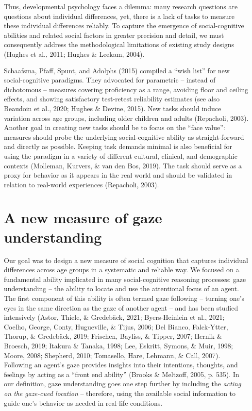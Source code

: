 \documentclass[
  man,floatsintext]{apa6}
\begin{document}
Thus, developmental psychology faces a dilemma: many research questions are questions about individual differences, yet, there is a lack of tasks to measure these individual differences reliably.
To capture the emergence of social-cognitive abilities and related social factors in greater precision and detail, we must consequently address the methodological limitations of existing study designs (Hughes et al., 2011; Hughes \& Leekam, 2004).

Schaafsma, Pfaff, Spunt, and Adolphs (2015) compiled a ``wish list'' for new social-cognitive paradigms.
They advocated for parametric -- instead of dichotomous -- measures covering proficiency as a range, avoiding floor and ceiling effects, and showing satisfactory test-retest reliability estimates (see also Beaudoin et al., 2020; Hughes \& Devine, 2015).
New tasks should induce variation across age groups, including older children and adults (Repacholi, 2003).
Another goal in creating new tasks should be to focus on the ``face value'': measures should probe the underlying social-cognitive ability as straight-forward and directly as possible.
Keeping task demands minimal is also beneficial for using the paradigm in a variety of different cultural, clinical, and demographic contexts (Molleman, Kurvers, \& van den Bos, 2019).
The task should serve as a proxy for behavior as it appears in the real world and should be validated in relation to real-world experiences (Repacholi, 2003).

\hypertarget{a-new-measure-of-gaze-understanding}{%
\section{A new measure of gaze understanding}\label{a-new-measure-of-gaze-understanding}}

Our goal was to design a new measure of social cognition that captures individual differences across age groups in a systematic and reliable way.
We focused on a fundamental ability implicated in many social-cognitive reasoning processes: gaze understanding -- the ability to locate and use the attentional focus of an agent.
The first component of this ability is often termed gaze following -- turning one's eyes in the same direction as the gaze of another agent -- and has been studied intensively (Astor, Thiele, \& Gredebäck, 2021; Byers-Heinlein et al., 2021; Coelho, George, Conty, Hugueville, \& Tijus, 2006; Del Bianco, Falck-Ytter, Thorup, \& Gredebäck, 2019; Frischen, Bayliss, \& Tipper, 2007; Hernik \& Broesch, 2019; Itakura \& Tanaka, 1998; Lee, Eskritt, Symons, \& Muir, 1998; Moore, 2008; Shepherd, 2010; Tomasello, Hare, Lehmann, \& Call, 2007).
Following an agent's gaze provides insights into their intentions, thoughts, and feelings by acting as a ``front end ability'' (Brooks \& Meltzoff, 2005, p. 535).
In our definition, gaze understanding goes one step further by including the \emph{acting on the gaze-cued location} -- therefore, using the available social information to guide one's behavior as needed in real-life conditions.
\end{document}
